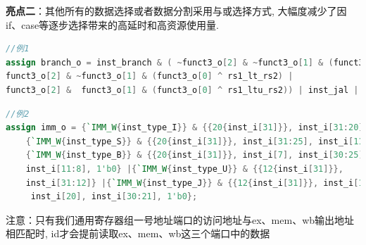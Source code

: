 \documentclass[lang=cn,11pt,a4paper,chinesefont=founder]{elegantpaper}
\begin{document}
\textbf{亮点二}：其他所有的数据选择或者数据分割采用与或选择方式, 大幅度减少了因if、case等逐步选择带来的高延时和高资源使用量. 
\begin{lstlisting}[language=verilog]
//例1
assign branch_o = inst_branch & ( ~funct3_o[2] & ~funct3_o[1] & (funct3_o[0] ^ rs1_eq_rs2) |
funct3_o[2] & ~funct3_o[1] & (funct3_o[0] ^ rs1_lt_rs2) |
funct3_o[2] &  funct3_o[1] & (funct3_o[0] ^ rs1_ltu_rs2)) | inst_jal | inst_jalr;
\end{lstlisting}
\begin{lstlisting}[language=verilog]
//例2
assign imm_o = {`IMM_W{inst_type_I}} & {{20{inst_i[31]}}, inst_i[31:20]} |
	{`IMM_W{inst_type_S}} & {{20{inst_i[31]}}, inst_i[31:25], inst_i[11:7]} |
	{`IMM_W{inst_type_B}} & {{20{inst_i[31]}}, inst_i[7], inst_i[30:25], 
	inst_i[11:8], 1'b0} |{`IMM_W{inst_type_U}} & {{12{inst_i[31]}}, 
	inst_i[31:12]} |{`IMM_W{inst_type_J}} & {{12{inst_i[31]}}, inst_i[19:12],
	 inst_i[20], inst_i[30:21], 1'b0};
\end{lstlisting}
注意：只有我们通用寄存器组一号地址端口的访问地址与ex、mem、wb输出地址相匹配时, id才会提前读取ex、mem、wb这三个端口中的数据
\end{document}
